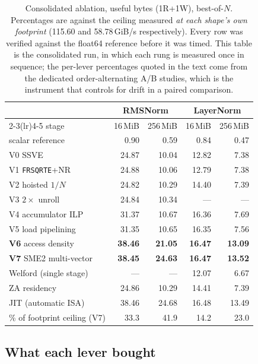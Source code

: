 \documentclass[conference,10pt]{IEEEtran}
\newcommand{\code}[1]{\texttt{\small #1}}
\begin{document}
\begin{table}[t]
\caption{Consolidated ablation, useful bytes (1R+1W), best-of-$N$. Percentages
are against the ceiling measured \emph{at each shape's own footprint}
(115.60 and 58.78\,GiB/s respectively). Every row was verified against the
float64 reference before it was timed. This table is the consolidated run, in
which each rung is measured once in sequence; the per-lever percentages quoted
in the text come from the dedicated order-alternating A/B studies, which is the
instrument that controls for drift in a paired comparison.}
\label{tab:ablation}
\centering
\small
\begin{tabular}{lrrrr}
\toprule
& \multicolumn{2}{c}{RMSNorm} & \multicolumn{2}{c}{LayerNorm} \\
\cmidrule(lr){2-3}\cmidrule(lr){4-5}
stage & 16\,MiB & 256\,MiB & 16\,MiB & 256\,MiB \\
\midrule
scalar reference & 0.90 & 0.59 & 0.84 & 0.47 \\
V0 SSVE & 24.87 & 10.04 & 12.82 & 7.38 \\
V1 \code{FRSQRTE}+NR & 24.88 & 10.06 & 12.79 & 7.38 \\
V2 hoisted $1/N$ & 24.82 & 10.29 & 14.40 & 7.39 \\
V3 $2\times$ unroll & 24.84 & 10.34 & --- & --- \\
V4 accumulator ILP & 31.37 & 10.67 & 16.36 & 7.69 \\
V5 load pipelining & 31.35 & 10.65 & 16.35 & 7.56 \\
\textbf{V6} access density & \textbf{38.46} & \textbf{21.05} & \textbf{16.47} & \textbf{13.09} \\
\textbf{V7} SME2 multi-vector & \textbf{38.45} & \textbf{24.63} & \textbf{16.47} & \textbf{13.52} \\
Welford (single stage) & --- & --- & 12.07 & 6.67 \\
ZA residency & 24.86 & 10.29 & 14.41 & 7.39 \\
JIT (automatic ISA) & 38.46 & 24.68 & 16.48 & 13.49 \\
\midrule
\% of footprint ceiling (V7) & 33.3 & 41.9 & 14.2 & 23.0 \\
\bottomrule
\end{tabular}
\end{table}

\subsection{What each lever bought}
\end{document}
